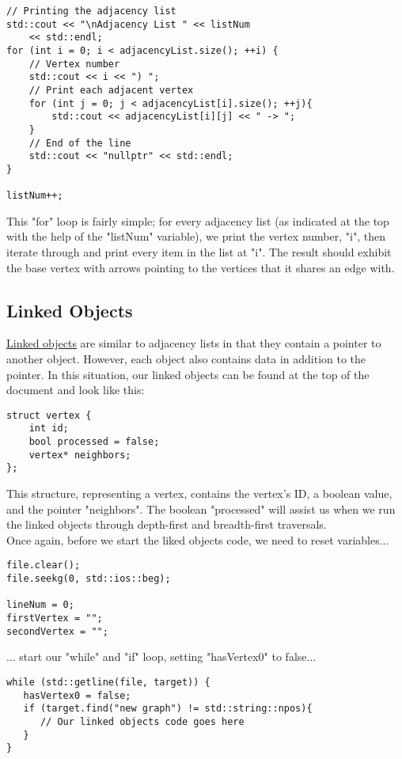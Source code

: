 \documentclass{article}
\begin{document}
\begin{lstlisting}
// Printing the adjacency list
std::cout << "\nAdjacency List " << listNum 
    << std::endl;
for (int i = 0; i < adjacencyList.size(); ++i) {
    // Vertex number
    std::cout << i << ") ";
    // Print each adjacent vertex
    for (int j = 0; j < adjacencyList[i].size(); ++j){
        std::cout << adjacencyList[i][j] << " -> ";
    }
    // End of the line
    std::cout << "nullptr" << std::endl;
}

listNum++;
\end{lstlisting}
This "for" loop is fairly simple; for every adjacency list (as indicated at the top with the help of the "listNum" variable), we print the vertex number, "i", then iterate through and print every item in the list at "i". The result should exhibit the base vertex with arrows pointing to the vertices that it shares an edge with.

\pagebreak

\subsection{Linked Objects}
\underline{Linked objects} are similar to adjacency lists in that they contain a pointer to another object. However, each object also contains data in addition to the pointer. In this situation, our linked objects can be found at the top of the document and look like this:

\begin{lstlisting}
struct vertex {
    int id;
    bool processed = false;
    vertex* neighbors;
};
\end{lstlisting}
This structure, representing a vertex, contains the vertex's ID, a boolean value, and the pointer "neighbors". The boolean "processed" will assist us when we run the linked objects through depth-first and breadth-first traversals. \\
Once again, before we start the liked objects code, we need to reset variables...
\begin{lstlisting}
file.clear();
file.seekg(0, std::ios::beg);

lineNum = 0;
firstVertex = "";
secondVertex = "";
\end{lstlisting}

... start our "while" and "if" loop, setting "hasVertex0" to false...
\begin{lstlisting}
while (std::getline(file, target)) {
   hasVertex0 = false;
   if (target.find("new graph") != std::string::npos){
      // Our linked objects code goes here
   }
}
\end{lstlisting}
\end{document}
